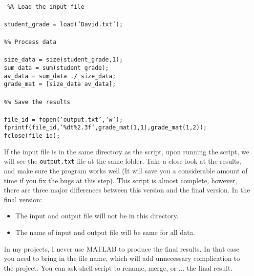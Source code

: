 \begin{mdframed}[hidealllines=true,backgroundcolor=gray!20]
\begin{singlespace}
\fontsize{10pt}{1pt}
\texttt{
\\
\noindent
{ \color{matlab_green} \%\% Load the input file} \\
\\
 student\_grade = load({\color{matlab_pink}'David.txt'}); \\
 \\
 {\color{matlab_green}\%\% Process data}\\
 \\
size\_data = size(student\_grade,1);\\
sum\_data = sum(student\_grade); \\
av\_data = sum\_data ./ size\_data; \\
grade\_mat = [size\_data av\_data]; \\
\\
{\color{matlab_green}\%\% Save the results}\\
\\
 file\_id = fopen({\color{matlab_pink}'output.txt'},{\color{matlab_pink}'w'});\\
 fprintf(file\_id,{\color{matlab_pink}'\%dt\%2.3f'},grade\_mat(1,1),grade\_mat(1,2));\\
 fclose(file\_id);\\
 }
\end{singlespace}
\end{mdframed}

\noindent
If the input file is in the same directory as the script, upon running the script, we will see the \texttt{output.txt} file at the same folder. Take a close look at the results, and make sure the program works well (It will save you a considerable amount of time if you fix the bugs at this step). This script is almost complete, however, there are three major differences between this version and the final version. In the final version:

\begin{itemize}
\item{The input and output file will not be in this directory.}
\item{The name of input and output file will be same for all data.}
\end{itemize}
\noindent
In my projects, I never use MATLAB to produce the final results. In that case you need to bring in the file name, which will add unnecessary complication to the project. You can ask shell script to rename, merge, or ... the final result. \\


